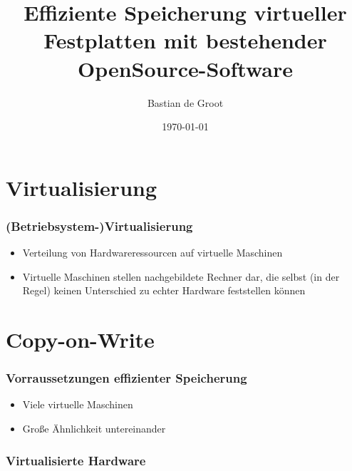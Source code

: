 \documentclass{beamer}
\begin{document}
\title{Effiziente Speicherung virtueller Festplatten mit bestehender OpenSource-Software}  
\author{Bastian de Groot}
\date{\today} 


\begin{frame}
\titlepage
\end{frame} 

\section{Virtualisierung}
\begin{frame}
\frametitle{(Betriebsystem-)Virtualisierung}
\fontsize{15pt}{25pt} \selectfont
\begin{itemize}
 \item Verteilung von Hardwareressourcen auf virtuelle Maschinen \pause  %
 \item Virtuelle Maschinen stellen nachgebildete Rechner dar, die selbst (in der Regel) keinen Unterschied zu echter Hardware feststellen können
\end{itemize}
\end{frame}

\section{Copy-on-Write}

\begin{frame}
\frametitle{Vorraussetzungen effizienter Speicherung}
\fontsize{20pt}{25pt} \selectfont
\begin{itemize}
 \item Viele virtuelle Maschinen \pause
 \item Große Ähnlichkeit untereinander 
\end{itemize}

\end{frame}

\begin{frame}
\frametitle{Virtualisierte Hardware} 
\fontsize{20pt}{25pt} \selectfont
\begin{itemize}
\end{itemize}
\end{frame}
\end{document}
